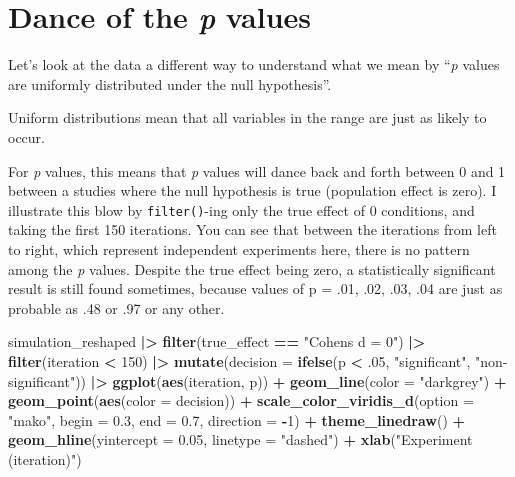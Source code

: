 \documentclass[
]{article}
\newenvironment{Shaded}{\begin{snugshade}}{\end{snugshade}}
\newcommand{\AttributeTok}[1]{\textcolor[rgb]{0.13,0.29,0.53}{#1}}
\newcommand{\DecValTok}[1]{\textcolor[rgb]{0.00,0.00,0.81}{#1}}
\newcommand{\FloatTok}[1]{\textcolor[rgb]{0.00,0.00,0.81}{#1}}
\newcommand{\FunctionTok}[1]{\textcolor[rgb]{0.13,0.29,0.53}{\textbf{#1}}}
\newcommand{\NormalTok}[1]{#1}
\newcommand{\SpecialCharTok}[1]{\textcolor[rgb]{0.81,0.36,0.00}{\textbf{#1}}}
\newcommand{\StringTok}[1]{\textcolor[rgb]{0.31,0.60,0.02}{#1}}
\begin{document}
\hypertarget{dance-of-the-p-values}{%
\section{\texorpdfstring{Dance of the \emph{p}
values}{Dance of the p values}}\label{dance-of-the-p-values}}

Let's look at the data a different way to understand what we mean by
``\emph{p} values are uniformly distributed under the null hypothesis''.

Uniform distributions mean that all variables in the range are just as
likely to occur.

For \emph{p} values, this means that \emph{p} values will dance back and
forth between 0 and 1 between a studies where the null hypothesis is
true (population effect is zero). I illustrate this blow by
\texttt{filter()}-ing only the true effect of 0 conditions, and taking
the first 150 iterations. You can see that between the iterations from
left to right, which represent independent experiments here, there is no
pattern among the \emph{p} values. Despite the true effect being zero, a
statistically significant result is still found sometimes, because
values of p = .01, .02, .03, .04 are just as probable as .48 or .97 or
any other.

\begin{Shaded}
\begin{Highlighting}[]
\NormalTok{simulation\_reshaped }\SpecialCharTok{|\textgreater{}}
  \FunctionTok{filter}\NormalTok{(true\_effect }\SpecialCharTok{==} \StringTok{"Cohen\textquotesingle{}s d = 0"}\NormalTok{) }\SpecialCharTok{|\textgreater{}}
  \FunctionTok{filter}\NormalTok{(iteration }\SpecialCharTok{\textless{}} \DecValTok{150}\NormalTok{) }\SpecialCharTok{|\textgreater{}}
  \FunctionTok{mutate}\NormalTok{(}\AttributeTok{decision =} \FunctionTok{ifelse}\NormalTok{(p }\SpecialCharTok{\textless{}}\NormalTok{ .}\DecValTok{05}\NormalTok{, }\StringTok{"significant"}\NormalTok{, }\StringTok{"non{-}significant"}\NormalTok{)) }\SpecialCharTok{|\textgreater{}}
  \FunctionTok{ggplot}\NormalTok{(}\FunctionTok{aes}\NormalTok{(iteration, p)) }\SpecialCharTok{+}
  \FunctionTok{geom\_line}\NormalTok{(}\AttributeTok{color =} \StringTok{"darkgrey"}\NormalTok{) }\SpecialCharTok{+}
  \FunctionTok{geom\_point}\NormalTok{(}\FunctionTok{aes}\NormalTok{(}\AttributeTok{color =}\NormalTok{ decision)) }\SpecialCharTok{+}
  \FunctionTok{scale\_color\_viridis\_d}\NormalTok{(}\AttributeTok{option =} \StringTok{"mako"}\NormalTok{, }\AttributeTok{begin =} \FloatTok{0.3}\NormalTok{, }\AttributeTok{end =} \FloatTok{0.7}\NormalTok{, }\AttributeTok{direction =} \SpecialCharTok{{-}}\DecValTok{1}\NormalTok{) }\SpecialCharTok{+}
  \FunctionTok{theme\_linedraw}\NormalTok{() }\SpecialCharTok{+}
  \FunctionTok{geom\_hline}\NormalTok{(}\AttributeTok{yintercept =} \FloatTok{0.05}\NormalTok{, }\AttributeTok{linetype =} \StringTok{"dashed"}\NormalTok{) }\SpecialCharTok{+}
  \FunctionTok{xlab}\NormalTok{(}\StringTok{"Experiment (iteration)"}\NormalTok{)}
\end{Highlighting}
\end{Shaded}
\end{document}
